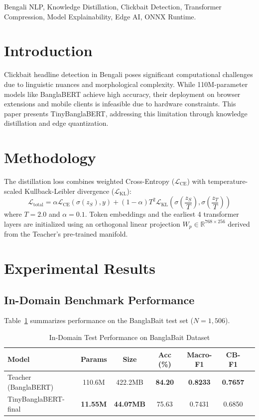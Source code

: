 \documentclass[conference]{IEEEtran}
\begin{document}
\begin{IEEEkeywords}
Bengali NLP, Knowledge Distillation, Clickbait Detection, Transformer Compression, Model Explainability, Edge AI, ONNX Runtime.
\end{IEEEkeywords}

\section{Introduction}
Clickbait headline detection in Bengali poses significant computational challenges due to linguistic nuances and morphological complexity. While 110M-parameter models like BanglaBERT achieve high accuracy, their deployment on browser extensions and mobile clients is infeasible due to hardware constraints. This paper presents TinyBanglaBERT, addressing this limitation through knowledge distillation and edge quantization.

\section{Methodology}
The distillation loss combines weighted Cross-Entropy ($\mathcal{L}_{\text{CE}}$) with temperature-scaled Kullback-Leibler divergence ($\mathcal{L}_{\text{KL}}$):
\begin{equation}
\mathcal{L}_{\text{total}} = \alpha \mathcal{L}_{\text{CE}}\left(\sigma(z_S), y\right) + (1 - \alpha) T^2 \mathcal{L}_{\text{KL}}\left(\sigma\left(\frac{z_S}{T}\right), \sigma\left(\frac{z_T}{T}\right)\right)
\end{equation}
where $T=2.0$ and $\alpha=0.1$. Token embeddings and the earliest 4 transformer layers are initialized using an orthogonal linear projection $W_p \in \mathbb{R}^{768 \times 256}$ derived from the Teacher's pre-trained manifold.

\section{Experimental Results}

\subsection{In-Domain Benchmark Performance}
Table~\ref{tab:indomain} summarizes performance on the BanglaBait test set ($N=1,506$).

\begin{table}[htbp]
\caption{In-Domain Test Performance on BanglaBait Dataset}
\begin{center}
\begin{tabular}{lcccccc}
\toprule
\textbf{Model} & \textbf{Params} & \textbf{Size} & \textbf{Acc (\%)} & \textbf{Macro-F1} & \textbf{CB-F1} \\
\midrule
Teacher (BanglaBERT) & 110.6M & 422.2MB & \textbf{84.20} & \textbf{0.8233} & \textbf{0.7657} \\
TinyBanglaBERT-final & \textbf{11.55M} & \textbf{44.07MB} & 75.63 & 0.7431 & 0.6850 \\
\bottomrule
\end{tabular}
\label{tab:indomain}
\end{center}
\end{table}
\end{document}
